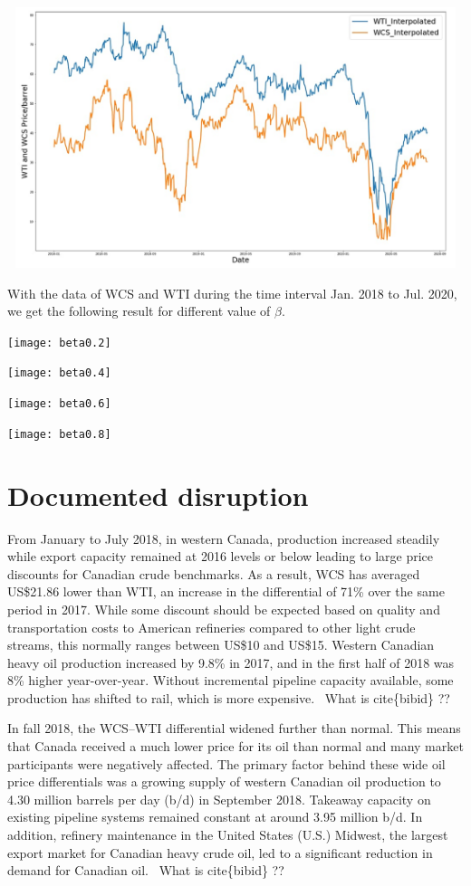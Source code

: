 \documentclass[11pt]{m2pi}
\begin{document}
\includegraphics[height=3in, width= 6in]{WTI-WCS-Price.PNG}

With the data of WCS and WTI during the time interval Jan. 2018 to Jul. 2020, we get the following result for different value of $\beta$.

\texttt{[image: beta0.2]}

\texttt{[image: beta0.4]}

\texttt{[image: beta0.6]}

\texttt{[image: beta0.8]}

\section{Documented disruption}
From January to July 2018, in western Canada, production increased steadily while export capacity remained at 2016 levels or below leading to large price discounts for Canadian crude benchmarks. As a result, WCS has averaged US\$21.86 lower than WTI, an increase in the differential of 71\% over the same period in 2017. While some discount should be expected based on quality and transportation costs to American refineries compared to other light crude streams, this normally ranges between US\$10 and US\$15. Western Canadian heavy oil production increased by 9.8\% in 2017, and in the first half of 2018 was 8\% higher year-over-year. Without incremental pipeline capacity available, some production has shifted to rail, which is more expensive.~\cite{bibid} {\color{red} What is cite\{bibid\} ??} 

In fall 2018, the WCS--WTI differential widened further than normal. This means that Canada received a much lower price for its oil than normal and many market participants were negatively affected. The primary factor behind these wide oil price differentials was a growing supply of western Canadian oil production to 4.30 million barrels per day (b/d) in September 2018. Takeaway capacity on existing pipeline systems remained constant at around 3.95 million b/d. In addition, refinery maintenance in the United States (U.S.) Midwest, the largest export market for Canadian heavy crude oil, led to a significant reduction in demand for Canadian oil.~\cite{bibid} {\color{red} What is cite\{bibid\} ??} 
\end{document}
